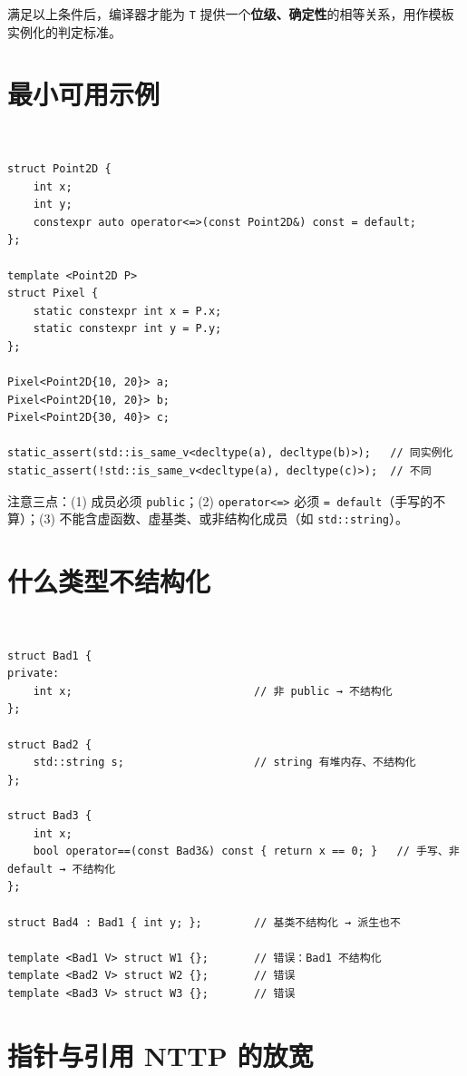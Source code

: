 \documentclass[12pt,a4paper,fontset=fandol]{ctexbook}
\newcommand{\cpplabel}{%
  \tcbox[on line,colback=cppheadbg,colframe=cppheadbg,
    boxrule=0pt,arc=1pt,left=2pt,right=2pt,top=1pt,bottom=1pt,
    colupper=white,fontupper=\scriptsize\bfseries]{C++}}
\newcommand{\cppxxlabel}[1]{%
  \tcbox[on line,colback=cpp20bg,colframe=cpp20bg,
    boxrule=0pt,arc=1pt,left=2pt,right=2pt,top=1pt,bottom=1pt,
    colupper=white,fontupper=\scriptsize\bfseries]{#1}}
\newcommand{\kw}[1]{\texttt{#1}}
\begin{document}
满足以上条件后，编译器才能为 \kw{T} 提供一个\textbf{位级、确定性}的相等关系，用作模板实例化的判定标准。

\section{最小可用示例}

\cppxxlabel{C++20}\ \begin{lstlisting}
struct Point2D {
    int x;
    int y;
    constexpr auto operator<=>(const Point2D&) const = default;
};

template <Point2D P>
struct Pixel {
    static constexpr int x = P.x;
    static constexpr int y = P.y;
};

Pixel<Point2D{10, 20}> a;
Pixel<Point2D{10, 20}> b;
Pixel<Point2D{30, 40}> c;

static_assert(std::is_same_v<decltype(a), decltype(b)>);   // 同实例化
static_assert(!std::is_same_v<decltype(a), decltype(c)>);  // 不同
\end{lstlisting}

注意三点：(1) 成员必须 \kw{public}；(2) \kw{operator<=>} 必须 \kw{= default}（手写的不算）；(3) 不能含虚函数、虚基类、或非结构化成员（如 \kw{std::string}）。

\section{什么类型不结构化}

\cpplabel\ \begin{lstlisting}
struct Bad1 {
private:
    int x;                            // 非 public → 不结构化
};

struct Bad2 {
    std::string s;                    // string 有堆内存、不结构化
};

struct Bad3 {
    int x;
    bool operator==(const Bad3&) const { return x == 0; }   // 手写、非 default → 不结构化
};

struct Bad4 : Bad1 { int y; };        // 基类不结构化 → 派生也不

template <Bad1 V> struct W1 {};       // 错误：Bad1 不结构化
template <Bad2 V> struct W2 {};       // 错误
template <Bad3 V> struct W3 {};       // 错误
\end{lstlisting}

\section{指针与引用 NTTP 的放宽}
\end{document}
